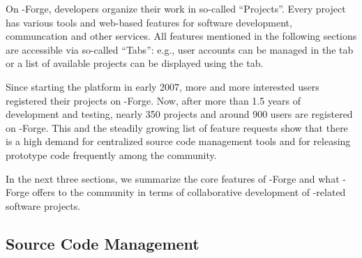 




On \R{}-Forge, developers organize their work
in so-called ``Projects''. Every project has various tools and
web-based features for software development, communcation and other
services. All features mentioned in the 
following sections are accessible via so-called 
``Tabs'': e.g., user accounts can be managed in the  tab or
a list of available projects can be displayed using the
 tab.

Since starting the platform in early 2007, more
and more interested users registered their projects on
\R{}-Forge. Now, after more than 1.5 years of development and testing, nearly
350 projects and around 900 
users are registered on \R{}-Forge. This and the steadily growing list of
feature requests show that there is a high demand for centralized source code
management tools and for releasing prototype code frequently among the
\R{} community. %

In the next three sections, we summarize the core features of
\R{}-Forge and what \R{}-Forge offers to the \R{} community in terms
of  collaborative development of \R{}-related software projects.

\subsection{Source Code Management}

